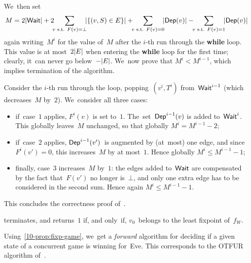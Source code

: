 We~then set
\[
M= 
2\size{\Wait} + 
2\hskip-4pt\sum_{v\text{ s.t. }F(v)=\bot}\hskip-4pt \size{\{(v,S)\in E\}} 
+ \hskip-4pt\sum_{v\text{ s.t. }F(v)=0}\hskip-4pt \size{\Dep(v)}
- \hskip-4pt\sum_{v\text{ s.t. }F(v)=1}\hskip-4pt \size{\Dep(v)}
\]
again writing~$M^i$ for the value of~$M$ after the $i$-th run through
the \textbf{while} loop.  This value is at most~$2|E|$ when
entering the \textbf{while} loop for the first time; clearly, it~can
never go below~$-|E|$. We~now prove that $M^{i}<M^{i-1}$,
which implies termination of the algorithm.

Consider the $i$-th run through the loop, popping~$(v^i,T^i)$
from~$\textsf{Wait}^{i-1}$ (which decreases~$M$ by~$2$). We~consider all three cases:
\begin{itemize}
\item if~case~$1$ applies, $F^i(v)$ is set to~$1$.
  The~set~$\textsf{Dep}^{i-1}(v)$ is added to~$\textsf{Wait}^i$. This globally
  leaves~$M$ unchanged, so that globally $M^i=M^{i-1}-2$;
\item if~case~$2$ applies, $\textsf{Dep}^{i-1}(v')$~is augmented by (at~most) one edge,
  and since $F^i(v')=0$, this increases~$M$ by at most~$1$. Hence globally
  $M^i\leq M^{i-1}-1$;
\item finally, case~$3$ increases~$M$ by~$1$: the edges added
  to~$\textsf{Wait}$ are compensated by the fact that~$F(v')$ no longer
  is~$\bot$, and only one extra edge has to be considered in the
  second sum. Hence again $M^i\leq M^{i-1}-1$.
\end{itemize}
This concludes the correctness proof of~.

\begin{theorem}
 terminates, and returns~$1$ if, and only~if,
$v_0$~belongs to the least fixpoint of~$f_W$.
\end{theorem}

Using~\cref{10-prop:fixp-game}, we~get a \emph{forward} algorithm for
deciding if a given state of a concurrent game is winning
for~Eve. This corresponds to the OTFUR algorithm
of~\cite{CDFLL05}.



